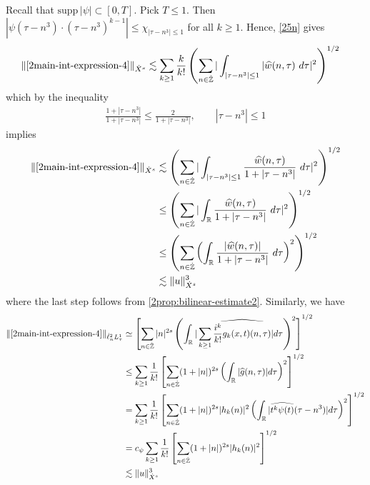 Recall that $\text{supp} \, |\psi| \subset [0, T ]$. Pick $T \le 1$. 
Then $| \psi\left( \tau - n^3 \right) \cdot \left( \tau - n^3 \right)^{k 
-1} | \le \chi_{| \tau - n^3 | \le 1}$ for all $k \ge 1$. Hence, \eqref{25n} gives
%
\begin{equation*}
	\begin{split}
		\|\eqref{2main-int-expression-4} \|_{\dot{X}^s} 
		& \lesssim \sum_{k \ge 1} \frac{k}{k!}  \left( \sum_{n \in \dot{\mathbb{Z}}} | 
		\int_{| \tau - n^{3}  |\le 1} | \widehat{w}(n, \tau) \ d \tau |^2 
		\right)^{1/2}
	\end{split}
\end{equation*}
%
which by the inequality
%
\begin{equation*}
	\begin{split}
		\frac{1 + | \tau - n^3 |}{1 + | \tau  - n^3 |} \le 
		\frac{2}{1 + | \tau - n^3 |}, \qquad | \tau - n^3  | \le 1
	\end{split}
\end{equation*}
%
implies
%
\begin{equation}
\label{2main-int4-est-X-s-part}
	\begin{split}
		\|\eqref{2main-int-expression-4}\|_{\dot{X}^s}
		& \lesssim \left( \sum_{n \in \dot{\mathbb{Z}}} | \int_{| \tau - n^{3}| \le 1 }
		\frac{\widehat{w}(n, \tau)}{1 + | \tau - n^3 |} \ d \tau |^2 
		\right)^{1/2}
		\\
		& \le \left( \sum_{n \in \dot{\mathbb{Z}}} | \int_{\mathbb{R}}
		\frac{\widehat{w}(n, \tau)}{1 + | \tau - n^3 |} \ d \tau |^2 
		\right)^{1/2} \\
		& \le \left( \sum_{n \in \dot{\mathbb{Z}}} \left( \int_{\mathbb{R}} 
		\frac{|\widehat{w}(n, \tau)|}{1 + | \tau - n^3 |}  \ d \tau  \right)^2
		\right)^{1/2} \\
		& \lesssim \|u\|_{\dot{X}^s}^3
	\end{split}
\end{equation}
%
where the last step follows from \cref{2prop:bilinear-estimate2}. Similarly,
we have
%
%
\begin{equation}
\label{2main-int4-est-Y-s-part}
	\begin{split}
		\|\eqref{2main-int-expression-4}\|_{\dot{\ell}^2_n L^1_\tau}
		& \simeq \left[ \sum_{n \in
		\dot{\mathbb{Z}}}|n|^{2s} \left( \int_{\mathbb{R}} | \sum_{k \ge 1}
		\widehat{\frac{i^{k}}{k!}g_{k}(x,t)(n, \tau)} |d \tau \right)^{2} \right]^{1/2}
		\\
		& \le \sum_{k \ge 1} \frac{1}{k!} \left[ \sum_{n \in \dot{\mathbb{Z}}} (1 + | n
		|)^{2s} \left( \int_{\mathbb{R}} | \widehat{g}(n, \tau) | d \tau \right)^{2}
		\right]^{1/2}
		\\
		& = \sum_{k \ge 1} \frac{1}{k!} \left[ \sum_{n \in \dot{\mathbb{Z}}} (1 + | n
		|)^{2s} | h_{k}(n) |^2 \left( \int_{\mathbb{R}} | \widehat{t^{k} \psi(t)}(\tau -
		n^{3}) |d \tau \right)^{2} \right]^{1/2}
		\\
		& = c_{\psi} \sum_{k \ge 1} \frac{1}{k!} \left[ \sum_{n \in \dot{\mathbb{Z}}} (1 + | n
		|)^{2s} | h_{k}(n) |^2 \right]^{1/2}
		\\
		& \lesssim \|u\|_{\dot{X}^s}^{3}
	\end{split}
\end{equation}
